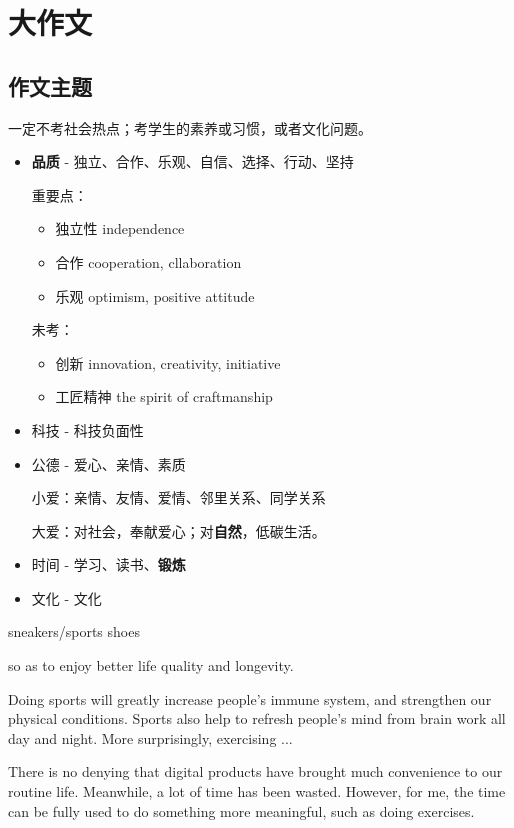 \chapter{大作文}

\section{作文主题}

一定不考社会热点；考学生的素养或习惯，或者文化问题。


\begin{itemize}
    \item \textbf{品质} - 独立、合作、乐观、自信、选择、行动、坚持
    
    重要点：\begin{itemize}
        \item 独立性 independence 
        \item 合作 cooperation, cllaboration 
        \item 乐观 optimism, positive attitude
    \end{itemize}

    未考：\begin{itemize}
        \item 创新 innovation, creativity, initiative 
        \item 工匠精神 the spirit of craftmanship
    \end{itemize}
    \item 科技 - 科技负面性
    \item 公德 - 爱心、亲情、素质
    
    小爱：亲情、友情、爱情、邻里关系、同学关系

    大爱：对社会，奉献爱心；对\textbf{自然}，低碳生活。
    \item 时间 - 学习、读书、\textbf{锻炼}
    \item 文化 - 文化
\end{itemize}


sneakers/sports shoes

so as to enjoy better life quality and longevity.

Doing sports will greatly increase people's immune system, and 
strengthen our physical conditions. 
Sports also help to refresh people's mind from brain work all day and night.
More surprisingly, exercising ... 


There is no denying that digital products have brought much convenience to our routine life. 
Meanwhile, a lot of time has been wasted. However, for me, the time can be fully used 
to do something more meaningful, such as doing exercises. 

